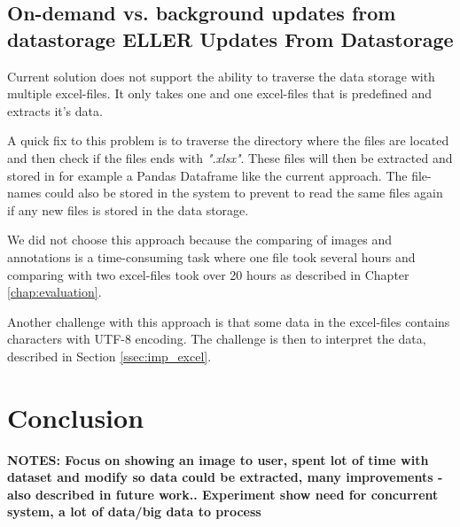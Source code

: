 \documentclass[USenglish]{uit-thesis}
\begin{document}
\section{On-demand vs. background updates from datastorage ELLER Updates From Datastorage} \label{sec:disc_updates}
Current solution does not support the ability to traverse the data storage with multiple excel-files. It only takes one and one excel-files that is predefined and extracts it's data.

A quick fix to this problem is to traverse the directory where the files are located and then check if the files ends with \textit{".xlsx"}. These files will then be extracted and stored in for example a Pandas Dataframe like the current approach. The file-names could also be stored in the system to prevent to read the same files again if any new files is stored in the data storage.

We did not choose this approach because the comparing of images and annotations is a time-consuming task where one file took several hours and comparing with two excel-files took over 20 hours as described in Chapter \ref{chap:evaluation}. %

Another challenge with this approach is that some data in the excel-files contains characters with UTF-8 encoding. The challenge is then to interpret the data, described in Section \ref{ssec:imp_excel}.





\chapter{Conclusion}
\textbf{NOTES: Focus on showing an image to user, spent lot of time with dataset and modify so data could be extracted, many improvements - also described in future work.. Experiment show need for concurrent system, a lot of data/big data to process}
\end{document}
